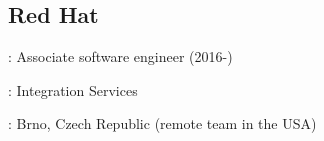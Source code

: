 \subsection*{Red Hat}

\begin{description}[noitemsep]
    \item[Title]: Associate software engineer (2016-)
    \item[Team]: Integration Services
    \item[Location]: Brno, Czech Republic (remote team in the USA)
\end{description}
